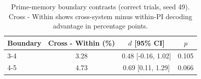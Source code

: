 \begin{table}[ht]
  \centering
  \small
  \caption{Prime-memory boundary contrasts (correct trials, seed 49).
  Cross - Within shows cross-system minus within-PI decoding advantage
  in percentage points.}
  \label{tab:boundary-contrast}
  \begin{tabular}{lccc}
    \toprule
    Boundary & Cross - Within (\%) & $d$ [95\% CI] & $p$ \\
    \midrule
    3-4 & 3.28 & 0.48 [-0.16, 1.02] & 0.105 \\
    4-5 & 4.73 & 0.69 [0.11, 1.29] & 0.066 \\
    \bottomrule
  \end{tabular}
\end{table}
